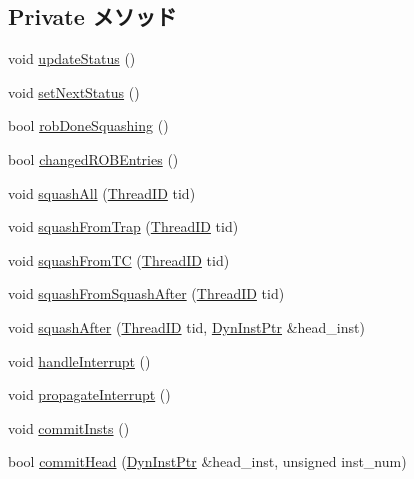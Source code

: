 \subsection*{Private メソッド}
\begin{DoxyCompactItemize}
\item 
void \hyperlink{classDefaultCommit_a4bb9486757ce225941aaaf759b357a57}{updateStatus} ()
\item 
void \hyperlink{classDefaultCommit_a4c5106e8a165f2f63807122b80a4e580}{setNextStatus} ()
\item 
bool \hyperlink{classDefaultCommit_a6949aa47bdaf57471e048da5c5b7c14c}{robDoneSquashing} ()
\item 
bool \hyperlink{classDefaultCommit_ac5a2190cdc184d1396bee3a6d99e34e7}{changedROBEntries} ()
\item 
void \hyperlink{classDefaultCommit_a9aa66ed2ab2c61003cbbc4f0cbb53a13}{squashAll} (\hyperlink{base_2types_8hh_ab39b1a4f9dad884694c7a74ed69e6a6b}{ThreadID} tid)
\item 
void \hyperlink{classDefaultCommit_a2f79a5e45c55f3cba92021d1a5ebaadf}{squashFromTrap} (\hyperlink{base_2types_8hh_ab39b1a4f9dad884694c7a74ed69e6a6b}{ThreadID} tid)
\item 
void \hyperlink{classDefaultCommit_ac4c7a18be5c282d711310ffb7b6f82f7}{squashFromTC} (\hyperlink{base_2types_8hh_ab39b1a4f9dad884694c7a74ed69e6a6b}{ThreadID} tid)
\item 
void \hyperlink{classDefaultCommit_a05dbc60b1e537c4a85f4ab6dec6ca9a4}{squashFromSquashAfter} (\hyperlink{base_2types_8hh_ab39b1a4f9dad884694c7a74ed69e6a6b}{ThreadID} tid)
\item 
void \hyperlink{classDefaultCommit_ad47b387a7bbc4a2153b50f96b8fd2a51}{squashAfter} (\hyperlink{base_2types_8hh_ab39b1a4f9dad884694c7a74ed69e6a6b}{ThreadID} tid, \hyperlink{classDefaultCommit_a028ce10889c5f6450239d9e9a7347976}{DynInstPtr} \&head\_\-inst)
\item 
void \hyperlink{classDefaultCommit_a1cb72a248a56b5dc2b2ed27db7560b90}{handleInterrupt} ()
\item 
void \hyperlink{classDefaultCommit_ab9d20a05498697dfc59478b80a0726fb}{propagateInterrupt} ()
\item 
void \hyperlink{classDefaultCommit_ac8b85fbfdf330d000c094a9d1886d264}{commitInsts} ()
\item 
bool \hyperlink{classDefaultCommit_a5beb5c9ae170034a8abe7a578e04e47a}{commitHead} (\hyperlink{classDefaultCommit_a028ce10889c5f6450239d9e9a7347976}{DynInstPtr} \&head\_\-inst, unsigned inst\_\-num)

\end{DoxyCompactItemize}
